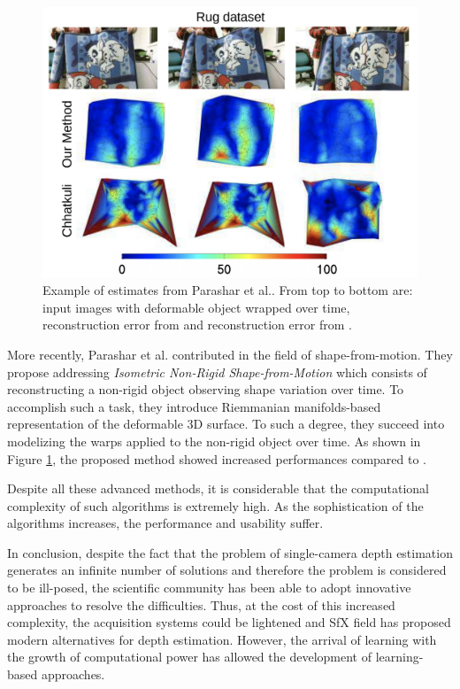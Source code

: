 \begin{figure}[h]
	\centering
	\includegraphics[width=0.8\linewidth]{Figures/SOA/parshar}
	\caption[Example of estimates from Parashar et al.]{Example of estimates from Parashar et al.\cite{parashar2016isometric}. From top to bottom are: input images with deformable object wrapped over time, reconstruction error from \cite{parashar2016isometric} and reconstruction error from \cite{chhatkuli2014non}.}
	\label{illuparshar}
\end{figure}


More recently, Parashar et al. \cite{parashar2016isometric} contributed in the field of shape-from-motion. They propose addressing \emph{Isometric Non-Rigid Shape-from-Motion} which consists of reconstructing a non-rigid object observing shape variation over time. To accomplish such a task, they introduce Riemmanian manifolds-based\cite{lee2006riemannian} representation of the deformable 3D surface. To such a degree, they succeed into modelizing the warps applied to the non-rigid object over time. As shown in Figure \ref{illuparshar}, the proposed method showed increased performances compared to \cite{chhatkuli2014non}.


Despite all these advanced methods, it is considerable that the computational complexity of such algorithms is extremely high. As the sophistication of the algorithms increases, the performance and usability suffer.



In conclusion, despite the fact that the problem of single-camera depth estimation generates an infinite number of solutions and therefore the problem is considered to be ill-posed, the scientific community has been able to adopt innovative approaches to resolve the difficulties. Thus, at the cost of this increased complexity, the acquisition systems could be lightened and SfX field has proposed modern alternatives for depth estimation.
However, the arrival of learning with the growth of computational power has allowed the development of learning-based approaches. 

